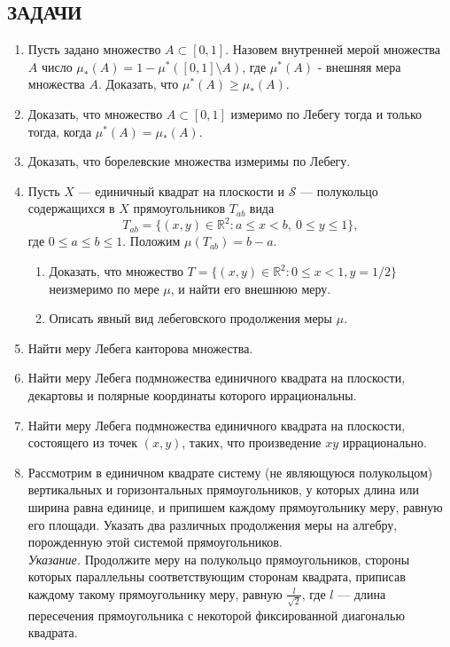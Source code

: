 \documentclass[12pt,a4paper]{article}
\begin{document}
\subsection*{ЗАДАЧИ}
\begin{enumerate}
\item Пусть задано множество $A \subset [0,1]$. Назовем внутренней мерой множества $A$ число $\mu_{*}(A) = 1 - \mu^{*}([0,1] \setminus A)$, где $\mu^{*}(A)$ - внешняя мера множества $A$. Доказать, что $\mu^{*}(A) \ge \mu_{*}(A)$.

\item Доказать, что множество $A \subset [0,1]$ измеримо по Лебегу тогда и только тогда, когда $\mu^{*}(A) = \mu_{*}(A)$.

\item Доказать, что борелевские множества измеримы по Лебегу.

\item Пусть $X$ — единичный квадрат на плоскости и $\mathcal{S}$ — полукольцо содержащихся в $X$ прямоугольников $T_{ab}$ вида
$$T_{ab} = \{(x,y) \in \mathbb{R}^{2} : a \le x < b, \ 0 \le y \le 1\},$$
где $0 \le a \le b \le 1$. Положим $\mu(T_{ab}) = b - a$.
\begin{enumerate}[label=\alph*)]
\item Доказать, что множество $T = \{(x,y) \in \mathbb{R}^{2} : 0 \le x < 1, y = 1/2\}$ неизмеримо по мере $\mu$, и найти его внешнюю меру.
\item Описать явный вид лебеговского продолжения меры $\mu$.
\end{enumerate}

\item Найти меру Лебега канторова множества.

\item Найти меру Лебега подмножества единичного квадрата на плоскости, декартовы и полярные координаты которого иррациональны.

\item Найти меру Лебега подмножества единичного квадрата на плоскости, состоящего из точек $(x, y)$, таких, что произведение $xy$ иррационально.

\item Рассмотрим в единичном квадрате систему (не являющуюся полукольцом) вертикальных и горизонтальных прямоугольников, у которых длина или ширина равна единице, и припишем каждому прямоугольнику меру, равную его площади. Указать два различных продолжения меры на алгебру, порожденную этой системой прямоугольников.\\
\textit{Указание.} Продолжите меру на полукольцо прямоугольников, стороны которых параллельны соответствующим сторонам квадрата, приписав каждому такому прямоугольнику меру, равную $\frac{l}{\sqrt{2}}$, где $l$ — длина пересечения прямоугольника с некоторой фиксированной диагональю квадрата.


\end{enumerate}
\end{document}
